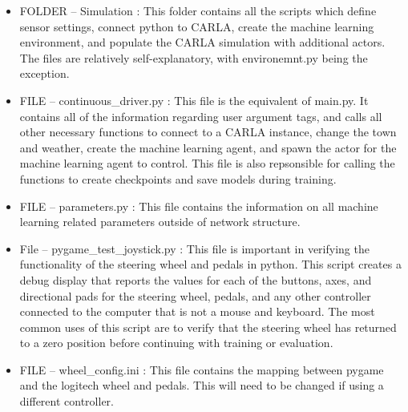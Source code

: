 \documentclass{article}
\begin{document}
\begin{itemize}
\item FOLDER -- Simulation : This folder contains all the scripts which define sensor settings, connect python to CARLA, create the machine learning environment, and populate the CARLA simulation with additional actors. The files are relatively self-explanatory, with environemnt.py being the exception.
\item FILE -- continuous\_driver.py : This file is the equivalent of main.py. It contains all of the information regarding user argument tags, and calls all other necessary functions to connect to a CARLA instance, change the town and weather, create the machine learning agent, and spawn the actor for the machine learning agent to control. This file is also repsonsible for calling the functions to create checkpoints and save models during training.
\item FILE -- parameters.py : This file contains the information on all machine learning related parameters outside of network structure.
\item File -- pygame\_test\_joystick.py : This file is important in verifying the functionality of the steering wheel and pedals in python. This script creates a debug display that reports the values for each of the buttons, axes, and directional pads for the steering wheel, pedals, and any other controller connected to the computer that is not a mouse and keyboard. The most common uses of this script are to verify that the steering wheel has returned to a zero position before continuing with training or evaluation.
\item FILE -- wheel\_config.ini : This file contains the mapping between pygame and the logitech wheel and pedals. This will need to be changed if using a different controller.

\end{itemize}
\end{document}
